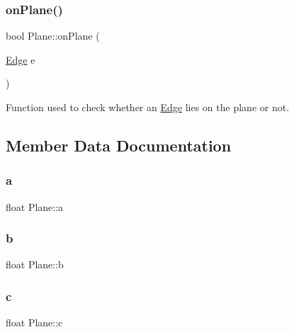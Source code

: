 \mbox{\label{structPlane_a3a525d011cf5214cf9223976ce113876}} 
\subsubsection{\texorpdfstring{on\+Plane()}{onPlane()}}
{\footnotesize\ttfamily bool Plane\+::on\+Plane (\begin{DoxyParamCaption}\item[{\hyperlink{structEdge}{Edge}}]{e }\end{DoxyParamCaption})\hspace{0.3cm}{\ttfamily [inline]}}



Function used to check whether an \hyperlink{structEdge}{Edge} lies on the plane or not. 



\subsection{Member Data Documentation}
\mbox{\label{structPlane_a818b693ba813d53949e18aa1416cc12a}} 
\subsubsection{\texorpdfstring{a}{a}}
{\footnotesize\ttfamily float Plane\+::a}

\mbox{\label{structPlane_a3d802fea10cfe6352e1792733d793b14}} 
\subsubsection{\texorpdfstring{b}{b}}
{\footnotesize\ttfamily float Plane\+::b}

\mbox{\label{structPlane_aec04c57607ffa16c210f955360ef4153}} 
\subsubsection{\texorpdfstring{c}{c}}
{\footnotesize\ttfamily float Plane\+::c}

\mbox{\label{structPlane_a61fc789fce8fbe72914f5397f1bbed44}} 
